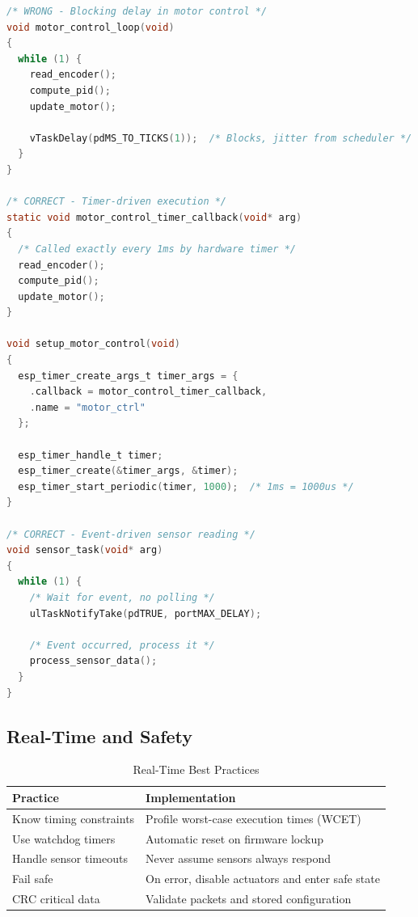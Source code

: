 \begin{lstlisting}[language=C]
/* WRONG - Blocking delay in motor control */
void motor_control_loop(void)
{
  while (1) {
    read_encoder();
    compute_pid();
    update_motor();
    
    vTaskDelay(pdMS_TO_TICKS(1));  /* Blocks, jitter from scheduler */
  }
}

/* CORRECT - Timer-driven execution */
static void motor_control_timer_callback(void* arg)
{
  /* Called exactly every 1ms by hardware timer */
  read_encoder();
  compute_pid();
  update_motor();
}

void setup_motor_control(void)
{
  esp_timer_create_args_t timer_args = {
    .callback = motor_control_timer_callback,
    .name = "motor_ctrl"
  };
  
  esp_timer_handle_t timer;
  esp_timer_create(&timer_args, &timer);
  esp_timer_start_periodic(timer, 1000);  /* 1ms = 1000us */
}

/* CORRECT - Event-driven sensor reading */
void sensor_task(void* arg)
{
  while (1) {
    /* Wait for event, no polling */
    ulTaskNotifyTake(pdTRUE, portMAX_DELAY);
    
    /* Event occurred, process it */
    process_sensor_data();
  }
}


\end{lstlisting}
\subsection{Real-Time and Safety}

\begin{table}[H]
\centering
\caption{Real-Time Best Practices}
\label{tab:realtime-practices}
\begin{tabular}{|l|p{9cm}|}
\hline
\textbf{Practice} & \textbf{Implementation} \\
\hline
Know timing constraints & Profile worst-case execution times (WCET) \\
\hline
Use watchdog timers & Automatic reset on firmware lockup \\
\hline
Handle sensor timeouts & Never assume sensors always respond \\
\hline
Fail safe & On error, disable actuators and enter safe state \\
\hline
CRC critical data & Validate packets and stored configuration \\
\hline
\end{tabular}
\end{table}

